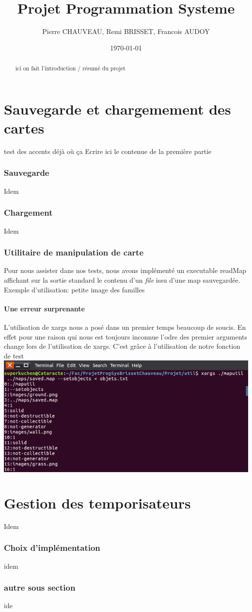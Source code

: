 \documentclass[a4paper]{article}
\title{Projet Programmation Systeme}
\author{Pierre CHAUVEAU, Remi BRISSET, Francois AUDOY}
\date{\today} %
\begin{document}
\maketitle


\begin{abstract}
  ici on fait l'introduction / résumé du projet
\end {abstract}

\part{Sauvegarde et chargemement des cartes}

test des accents déjà où ça
Ecrire ici le contenue de la première partie
\section{Sauvegarde}
Idem

\section{Chargement}
Idem

\section{Utilitaire de manipulation de carte}
Pour nous assister dans nos tests, nous avons implémenté un executable readMap affichant sur la sortie standard le contenu d'un \emph{file} issu d'une map sauvegardée.
Exemple d'utilisation:
petite image des familles 

\subsection{Une erreur surprenante}
L'utilisation de xargs nous a posé dans un premier temps beaucoup de soucis. En effet pour une raison qui nous est toujours inconnue l'odre des premier arguments change lors de l'utilisation de xargs. C'est grâce à l'utilisation de notre fonction de test %
\\
\includegraphics[scale=0.5]{erreurArgs.png}

\part{Gestion des temporisateurs}
Idem

\section{Choix d'implémentation}
idem

\section{autre sous section}
ide
\end{document}
